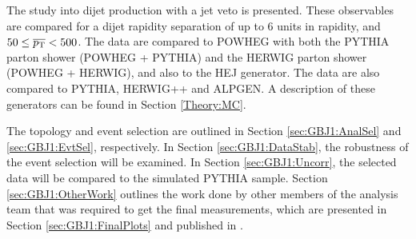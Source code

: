 The study into dijet production with a jet veto is presented.
These observables are compared for a dijet rapidity separation of up to 6 units in rapidity, and $50\le\mbox{$\overline{p_{\rm T}}$}{}<500$.
The data are compared to POWHEG with both the PYTHIA parton shower (POWHEG + PYTHIA) and the HERWIG parton shower (POWHEG + HERWIG), and also to the HEJ generator. 
The data are also compared to PYTHIA, HERWIG++ and ALPGEN.
A description of these generators can be found in Section \ref{Theory:MC}.

The topology and event selection are outlined in Section \ref{sec:GBJ1:AnalSel} and \ref{sec:GBJ1:EvtSel}, respectively. 
In Section \ref{sec:GBJ1:DataStab}, the robustness of the event selection will be examined. 
In Section \ref{sec:GBJ1:Uncorr}, the selected data will be compared to the simulated PYTHIA sample.
Section \ref{sec:GBJ1:OtherWork} outlines the work done by other members of the analysis team that was required to get the final measurements, which are presented in Section \ref{sec:GBJ1:FinalPlots} and published in \cite{ref:ATLASGap}. 

%

